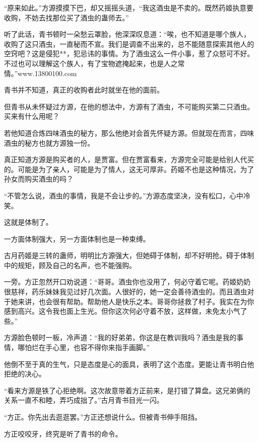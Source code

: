 
\begin{this_body}

“原来如此。”方源摸摸下巴，却又摇摇头道，“我这酒虫是不卖的。既然药姬执意要收购，不妨去找那位买了酒虫的蛊师去。”

听了此话，青书顿时一朵愁云罩脸，他深深叹息道：“唉，也不知道是哪个族人，收购了这只酒虫，一直秘而不宣。我们是调查不出来的，总不能随意探索其他人的空窍吧？这是侵犯**，犯忌讳的事情。为了酒虫这么一件小事，惹了众怒可不好。不过也可以理解这个族人，有了宝物遮掩起来，也是人之常情。”www.13800100.com

青书并不知道，真正的收购者此时就坐在他的面前。

但青书从未怀疑过方源，在他的想法中，方源有了酒虫，不可能购买第二只酒虫。买来有什么用呢？

若他知道合炼四味酒虫的秘方，那么他绝对会首先怀疑方源。但就现在而言，四味酒虫的秘方也就方源独一份。

真正知道方源是购买者的人，是贾富。但在贾富看来，方源完全可能是给别人代买的。可能是为了亲人，可能是为了情人，这无可厚非。药姬不也是这种情况，为了孙女而购买酒虫的吗？

“不管怎么说，酒虫的事情，我是不会让步的。”方源态度坚决，没有松口，心中冷笑。

这就是体制了。

一方面体制强大，另一方面体制也是一种束缚。

古月药姬是三转的蛊师，明明比方源强大，但她碍于体制，却不好明抢。碍于体制中的规矩，顾及自己的名声，也不能强购。

一旁。方正忽然开口劝说道：“哥哥。酒虫你也没用了，何必守着它呢。药姬奶奶很慈祥，药乐妹妹我见过好几次面。人很好的，她一定会善待酒虫的。而且酒虫对于她来讲，也会很有帮助。帮助他人是快乐之本。哥哥你拯救了村子。我实在为你感到高兴。这令我也面上生光。但你这次何必守着不放，这样做，未免太小气了些。”

方源脸色顿时一板，冷声道：“我的好弟弟，你这是在教训我吗？酒虫是我的事情，哪怕烂在手心里，也容不得你来指手画脚。”

他倒不至于真的生气，只是态度是心的面具，表明了这个态度。更能让青书明白他拒绝的决心。

“看来方源是铁了心拒绝啊。这次故意带着方正前来，是打错了算盘。这兄弟俩的关系一直不和睦，弄巧成拙了。”古月青书目光一闪。

“方正。你先出去逛逛罢。”方正还想说什么。但被青书伸手阻挡。

方正咬咬牙，终究是听了青书的命令。


\end{this_body}

